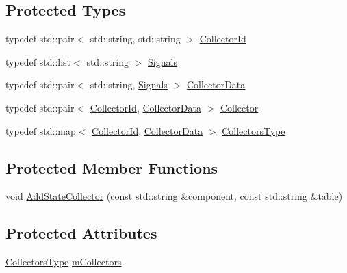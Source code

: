 \subsection*{Protected Types}
\begin{DoxyCompactItemize}
\item 
typedef std\+::pair$<$ std\+::string, std\+::string $>$ \hyperlink{classmts_collector_factory_adaeb0ec5b7392f2a011eb478334e86b6}{Collector\+Id}
\item 
typedef std\+::list$<$ std\+::string $>$ \hyperlink{classmts_collector_factory_a62e1c130f6074d6633efd23888e6b33f}{Signals}
\item 
typedef std\+::pair$<$ std\+::string, \hyperlink{classmts_collector_factory_a62e1c130f6074d6633efd23888e6b33f}{Signals} $>$ \hyperlink{classmts_collector_factory_aca25b6c09f469fe168d3fc99ef7aec8d}{Collector\+Data}
\item 
typedef std\+::pair$<$ \hyperlink{classmts_collector_factory_adaeb0ec5b7392f2a011eb478334e86b6}{Collector\+Id}, \hyperlink{classmts_collector_factory_aca25b6c09f469fe168d3fc99ef7aec8d}{Collector\+Data} $>$ \hyperlink{classmts_collector_factory_abe3e52266409a03bcf7ba68004ee08d2}{Collector}
\item 
typedef std\+::map$<$ \hyperlink{classmts_collector_factory_adaeb0ec5b7392f2a011eb478334e86b6}{Collector\+Id}, \hyperlink{classmts_collector_factory_aca25b6c09f469fe168d3fc99ef7aec8d}{Collector\+Data} $>$ \hyperlink{classmts_collector_factory_ae977f45bdbb0d62035689490d5bf54ee}{Collectors\+Type}
\end{DoxyCompactItemize}
\subsection*{Protected Member Functions}
\begin{DoxyCompactItemize}
\item 
void \hyperlink{classmts_collector_factory_a6cf61433ca47519803c8b2db3bbf9cdd}{Add\+State\+Collector} (const std\+::string \&component, const std\+::string \&table)
\end{DoxyCompactItemize}
\subsection*{Protected Attributes}
\begin{DoxyCompactItemize}
\item 
\hyperlink{classmts_collector_factory_ae977f45bdbb0d62035689490d5bf54ee}{Collectors\+Type} \hyperlink{classmts_collector_factory_a273acdf27438201813650b068c576d9b}{m\+Collectors}
\end{DoxyCompactItemize}
